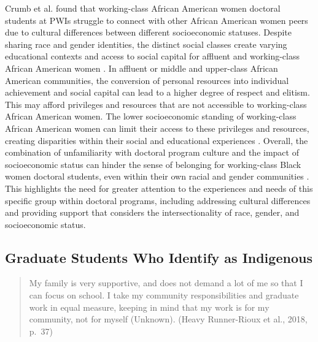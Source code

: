 \documentclass[
  11pt,
]{book}
\begin{document}
Crumb et al. \citeyearpar{crumb_illuminating_2020} found that working-class African American women doctoral students at PWIs struggle to connect with other African American women peers due to cultural differences between different socioeconomic statuses. Despite sharing race and gender identities, the distinct social classes create varying educational contexts and access to social capital for affluent and working-class African American women \citep{crumb_illuminating_2020}. In affluent or middle and upper-class African American communities, the conversion of personal resources into individual achievement and social capital can lead to a higher degree of respect and elitism. This may afford privileges and resources that are not accessible to working-class African American women. The lower socioeconomic standing of working-class African American women can limit their access to these privileges and resources, creating disparities within their social and educational experiences \citep{crumb_illuminating_2020}. Overall, the combination of unfamiliarity with doctoral program culture and the impact of socioeconomic status can hinder the sense of belonging for working-class Black women doctoral students, even within their own racial and gender communities \citep{crumb_illuminating_2020}. This highlights the need for greater attention to the experiences and needs of this specific group within doctoral programs, including addressing cultural differences and providing support that considers the intersectionality of race, gender, and socioeconomic status.

\subsection{Graduate Students Who Identify as Indigenous}\label{graduate-students-who-identify-as-indigenous}

\begin{quote}
My family is very supportive, and does not demand a lot of me so that I can focus on school. I take my community responsibilities and graduate work in equal measure, keeping in mind that my work is for my community, not for myself (Unknown). (Heavy Runner-Rioux et al., 2018, p.~37)
\end{quote}
\end{document}
